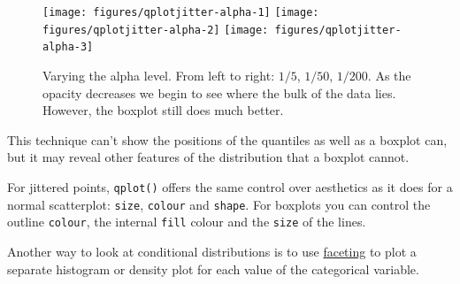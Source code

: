 \begin{Shaded}
\begin{Highlighting}[]
\StringTok{ }  \NormalTok{,}
  \NormalTok{(} \NormalTok{/}\StringTok{ }\NormalTok{))}
\StringTok{ }  \NormalTok{,}
  \NormalTok{(} \NormalTok{/}\StringTok{ }\NormalTok{))}
\StringTok{ }  \NormalTok{,}
  \NormalTok{(} \NormalTok{/}\StringTok{ }\NormalTok{))}
\end{Highlighting}
\end{Shaded}

\begin{figure}
\texttt{[image: figures/qplotjitter-alpha-1]} \texttt{[image: figures/qplotjitter-alpha-2]} \texttt{[image: figures/qplotjitter-alpha-3]} \caption{Varying the alpha level.  From left to right: $1/5$, $1/50$, $1/200$.  As the opacity decreases we begin to see where the bulk of the data lies.  However, the boxplot still does much better.\label{fig:jitter-alpha}}
\end{figure}

This technique can't show the positions of the quantiles as well as a
boxplot can, but it may reveal other features of the distribution that a
boxplot cannot.

For jittered points, \texttt{qplot()} offers the same control over
aesthetics as it does for a normal scatterplot: \texttt{size},
\texttt{colour} and \texttt{shape}. For boxplots you can control the
outline \texttt{colour}, the internal \texttt{fill} colour and the
\texttt{size} of the lines.

Another way to look at conditional distributions is to use
\hyperref[sec:qplot-faceting]{faceting} to plot a separate histogram or
density plot for each value of the categorical variable.


